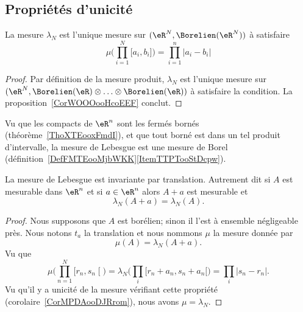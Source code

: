 \subsection{Propriétés d'unicité}

\begin{corollary}       \label{CorMPDAooDJRrom}
    La mesure \( \lambda_N\) est l'unique mesure sur \(   (\eR^N,  \Borelien(\eR^N) )   \) à satisfaire
    \begin{equation}
        \mu\big( \prod_{i=1}^N\mathopen[ a_i , b_i \mathclose] \big)=\prod_{i=1}^n| a_i-b_i |
    \end{equation}
\end{corollary}

\begin{proof}
    Par définition de la mesure produit, \( \lambda_N\) est l'unique mesure sur \(   (\eR^N,  \Borelien(\eR)\otimes\ldots\otimes\Borelien(\eR) )   \) à satisfaire la condition. La proposition~\ref{CorWOOOooHcoEEF} conclut.
\end{proof}

Vu que les compacts de \( \eR^n\) sont les fermés bornés (théorème~\ref{ThoXTEooxFmdI}), et que tout borné est dans un tel produit d'intervalle, la mesure de Lebesgue est une mesure de Borel (définition~\ref{DefFMTEooMjbWKK}\ref{ItemTTPTooStDcpw}).

\begin{theorem}        \label{THOooTMWHooThsDHj}
    La mesure de Lebesgue est invariante par translation. Autrement dit si \( A\) est mesurable dans \( \eR^n\) et si \( a\in \eR^n\) alors \( A+a\) est mesurable et
    \begin{equation}
        \lambda_N(A+a)=\lambda_N(A).
    \end{equation}
\end{theorem}

\begin{proof}
    Nous supposons que \( A\) est borélien; sinon il l'est à ensemble négligeable près. Nous notons \( t_a\) la translation et nous nommons \( \mu\) la mesure donnée par
    \begin{equation}
        \mu(A)=\lambda_N(A+a).
    \end{equation}
    Vu que
    \begin{equation}
        \mu\big( \prod_{n=1}^N\mathopen[ r_n , s_n \mathclose[ \big)=\lambda_N\big( \prod_i\mathopen[ r_n+a_n , s_n+a_n [ \big)=\prod_i| s_n-r_n |.
    \end{equation}
    Vu qu'il y a unicité de la mesure vérifiant cette propriété (corolaire~\ref{CorMPDAooDJRrom}), nous avons \( \mu=\lambda_N\).
\end{proof}

